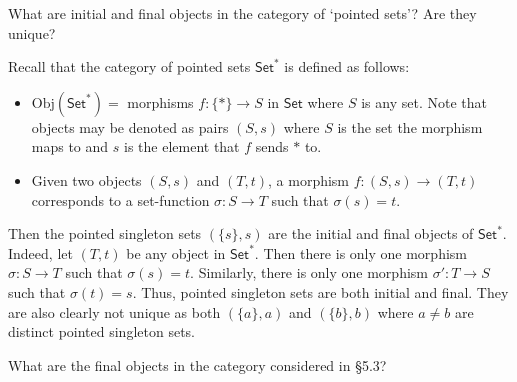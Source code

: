 \documentclass[../../master.tex]{subfiles}
\begin{document}
    \begin{problem}
      What are initial and final objects in the category of `pointed sets'?
      Are they unique?
    \end{problem}

    \begin{solution}
      Recall that the category of pointed sets \(\mathsf{Set}^{*}\) is defined as follows:
      \begin{itemize}
        \item \(\text{Obj}(\mathsf{Set}^{*}) =\) morphisms \(f: \{*\} \to S\) in \(\mathsf{Set}\) where \(S\) is any set.
        Note that objects may be denoted as pairs \((S, s)\) where \(S\) is the set the morphism maps to and \(s\) is the element that \(f\) sends \(*\) to.
        \item Given two objects \((S, s)\) and \((T, t)\), a morphism \(f: (S, s) \to (T, t)\) corresponds to a set-function \(\sigma: S \to T\) such that \(\sigma(s) = t\).
      \end{itemize}
      Then the pointed singleton sets \((\{s\}, s)\) are the initial and final objects of \(\mathsf{Set}^{*}\).
      Indeed, let \((T, t)\) be any object in \(\mathsf{Set}^{*}\).
      Then there is only one morphism \(\sigma: S \to T\) such that \(\sigma(s) = t\).
      Similarly, there is only one morphism \(\sigma': T \to S\) such that \(\sigma(t) = s\).
      Thus, pointed singleton sets are both initial and final.
      They are also clearly not unique as both \((\{a\}, a)\) and \((\{b\}, b)\) where \(a \neq b\) are distinct pointed singleton sets.
    \end{solution}

    \begin{problem}
      What are the final objects in the category considered in \S 5.3?
    \end{problem}
\end{document}
